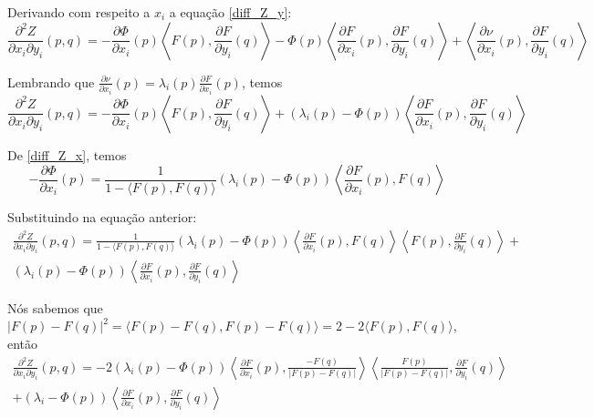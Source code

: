 \begin{demonstracao}
	Derivando com respeito a $x_i$ a equação \ref{diff_Z_y}:
	\begin{equation*}
		\frac{\partial^2 Z}{\partial x_i \partial y_i}(p,q) = -\frac{\partial \Phi}{\partial x_i}(p) \left\langle F(p), \frac{\partial F}{\partial y_i}(q) \right\rangle - \Phi(p) \left\langle \frac{\partial F}{\partial x_i}(p), \frac{\partial F}{\partial y_i}(q) \right\rangle + \left\langle \frac{\partial \nu}{\partial x_i}(p), \frac{\partial F}{\partial y_i}(q) \right\rangle
	\end{equation*}
	
	Lembrando que $\frac{\partial \nu}{\partial x_i}(p) = \lambda_i(p) \frac{\partial F}{\partial x_i}(p)$, temos
	\begin{equation*}
		\frac{\partial^2 Z}{\partial x_i \partial y_i}(p,q) = -\frac{\partial \Phi}{\partial x_i}(p) \left\langle F(p), \frac{\partial F}{\partial y_i}(q) \right\rangle + (\lambda_i(p) - \Phi(p)) \left\langle \frac{\partial F}{\partial x_i}(p), \frac{\partial F}{\partial y_i}(q) \right\rangle
	\end{equation*}
	
	De \ref{diff_Z_x}, temos
	\begin{equation*}
		-\frac{\partial \Phi}{\partial x_i}(p) = \frac{1}{1 - \langle F(p),F(q) \rangle} (\lambda_i(p) - \Phi(p)) \left\langle \frac{\partial F}{\partial x_i}(p), F(q) \right\rangle
	\end{equation*}
	
	Substituindo na equação anterior:
	\begin{multline*}
		\frac{\partial^2 Z}{\partial x_i \partial y_i}(p,q) =  \frac{1}{1 - \langle F(p),F(q) \rangle} (\lambda_i(p) - \Phi(p)) \left\langle \frac{\partial F}{\partial x_i}(p), F(q) \right\rangle  \left\langle F(p), \frac{\partial F}{\partial y_i}(q) \right\rangle +\\
		(\lambda_i(p) - \Phi(p)) \left\langle \frac{\partial F}{\partial x_i}(p), \frac{\partial F}{\partial y_i}(q) \right\rangle
	\end{multline*}
	
	Nós sabemos que $|F(p) - F(q)|^2 = \langle F(p) - F(q), F(p) - F(q) \rangle = 2 - 2 \langle F(p), F(q) \rangle$, então
	\begin{multline*}
		\frac{\partial^2 Z}{\partial x_i \partial y_i}(p,q) = -2 (\lambda_i(p) - \Phi(p)) \left\langle \frac{\partial F}{\partial x_i}(p), \frac{-F(q)}{|F(p) - F(q)|} \right\rangle \left\langle \frac{F(p)}{|F(p) - F(q)|}, \frac{\partial F}{\partial y_i}(q) \right\rangle\\
		+ (\lambda_i - \Phi(p)) \left\langle \frac{\partial F}{\partial x_i}(p), \frac{\partial F}{\partial y_i}(q) \right\rangle
	\end{multline*}
	

\end{demonstracao}

